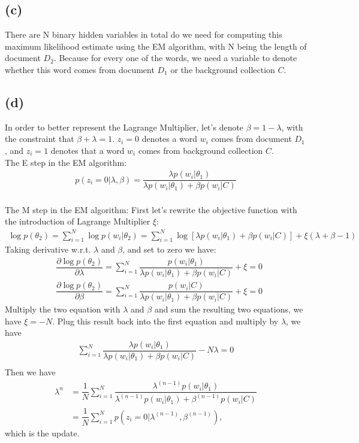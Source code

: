 \subsection*{(c)}
There are N binary hidden variables in total do we need for computing this maximum likelihood estimate using the EM algorithm, with N being the length of document $D_2$. Because for every one of the words, we need a variable to denote whether this word comes from document $D_1$ or the background collection $C$. 

\subsection*{(d)}
In order to better represent the Lagrange Multiplier, let's denote $\beta = 1 - \lambda$,  with the constraint that $\beta+\lambda = 1$. $z_i = 0 $ denotes a word $w_i$ comes from document $D_1$, and $z_i = 1$ denotes that a word $w_i$ comes from background collection $C$.\\
The E step in the EM algorithm:
\begin{align*}
p(z_i=0|\lambda,\beta)= \dfrac{\lambda p(w_i|\theta_1)}{\lambda p(w_i|\theta_1) + \beta p(w_i|C)}
\end{align*}
\\
The M step in the EM algorithm:
First let's rewrite the objective function with the introduction of Lagrange Multiplier $\xi$:
\begin{align*}
\log{p(\theta_2)} = \sum_{i=1}^N \log{p(w_i|\theta_2)} = \sum_{i=1}^N \log{ [\lambda p(w_i|\theta_1) + \beta p(w_i|C)]} + \xi(\lambda+\beta-1)
\end{align*}
Taking derivative w.r.t. $\lambda$ and $\beta$, and set to zero we have:
\begin{align*}
& \dfrac{\partial \log{p(\theta_2)}}{\partial \lambda} = \sum_{i=1}^N \dfrac{p(w_i|\theta_1)}{\lambda p(w_i|\theta_1) + \beta p(w_i|C)} + \xi = 0 \\
& \dfrac{\partial \log{p(\theta_2)}}{\partial \beta} = \sum_{i=1}^N \dfrac{p(w_i|C)}{\lambda p(w_i|\theta_1) + \beta p(w_i|C)} + \xi = 0 
\end{align*}
Multiply the two equation with $\lambda$ and $\beta$ and sum the resulting two equations, we have $\xi = -N$. Plug this result back into the first equation and multiply by $\lambda$, we have 
\begin{align*}
\sum_{i=1}^N \dfrac{\lambda p(w_i|\theta_1)}{\lambda p(w_i|\theta_1) + \beta p(w_i|C)}  - N\lambda = 0 \\
\end{align*}
Then we have 
\begin{align*}
\lambda ^n
&= \dfrac{1}{N}\sum_{i=1}^N \dfrac{\lambda^{(n-1)} p(w_i|\theta_1)}{\lambda^{(n-1)} p(w_i|\theta_1) + \beta^{(n-1)} p(w_i|C)}\\
& = \dfrac{1}{N} \sum_{i=1}^Np(z_i=0|\lambda^{(n-1)},\beta^{(n-1)}),
\end{align*}
which is the update.



